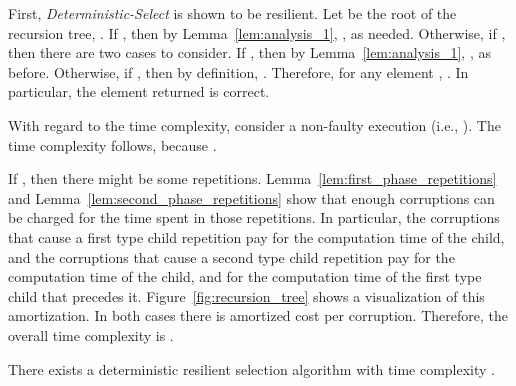 \documentclass{llncs}
\begin{document}
\begin{pf}
First, \emph{Deterministic-Select} is shown to be resilient. Let  be the root of the recursion tree, . If , then by Lemma~\ref{lem:analysis_1}, , as needed. Otherwise, if , then there are two cases to consider. If , then by Lemma~\ref{lem:analysis_1}, , as before. Otherwise, if , then by definition, . Therefore, for any element , . In particular, the element returned is correct.

With regard to the time complexity, consider a non-faulty execution (i.e., ). The time complexity  follows, because .

If , then there might be some repetitions. Lemma~\ref{lem:first_phase_repetitions} and Lemma~\ref{lem:second_phase_repetitions} show that enough corruptions can be charged for the time spent in those repetitions. In particular, the  corruptions that cause a first type child repetition pay for the  computation time of the child, and the  corruptions that cause a second type child repetition pay for the  computation time of the child, and for the  computation time of the first type child that precedes it. Figure~\ref{fig:recursion_tree} shows a visualization of this amortization. In both cases there is  amortized cost per corruption. Therefore, the overall time complexity is .
\end{pf}


























\begin{theorem}\label{theorem:det_select}
There exists a deterministic resilient selection algorithm with time complexity .
\end{theorem}
\end{document}

